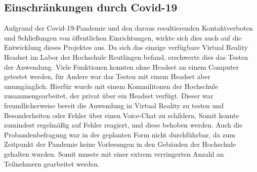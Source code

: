 \subsection{Einschränkungen durch Covid-19} \label{Covid}
Aufgrund der Covid-19-Pandemie und den daraus resultierenden Kontaktverboten und Schließungen von öffentlichen Einrichtungen, wirkte sich dies auch auf die Entwicklung dieses Projektes aus. Da sich das einzige verfügbare Virtual Reality Headset im Labor der Hochschule Reutlingen befand, erschwerte dies das Testen der Anwendung. Viele Funktionen konnten ohne Headset an einem Computer getestet werden, für Andere war das Testen mit einem Headset aber unumgänglich. Hierfür wurde mit einem Kommilitonen der Hochschule zusammengearbeitet, der privat über ein Headset verfügt. Dieser war freundlicherweise bereit die Anwendung in Virtual Reality zu testen und Besonderheiten oder Fehler über einen Voice-Chat zu schildern. Somit konnte zumindest regelmäßig auf Fehler reagiert, und diese behoben werden. \newline
Auch die Probandenbefragung war in der geplanten Form nicht durchführbar, da zum Zeitpunkt der Pandemie keine Vorlesungen in den Gebäuden der Hochschule gehalten wurden. Somit musste mit einer extrem verringerten Anzahl an Teilnehmern gearbeitet werden.
